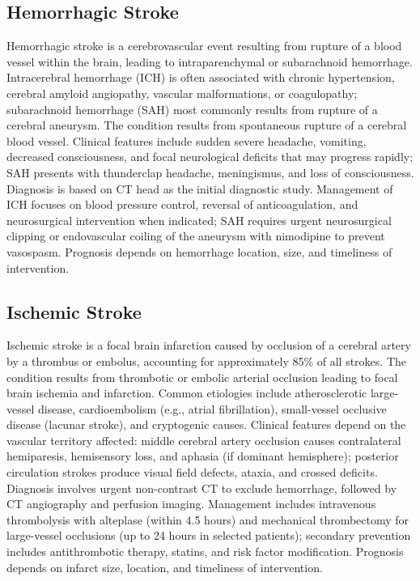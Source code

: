 \subsection{Hemorrhagic Stroke}
\label{sec:Hemorrhagic Stroke}
Hemorrhagic stroke is a cerebrovascular event resulting from rupture of a blood vessel within the brain, leading to intraparenchymal or subarachnoid hemorrhage. Intracerebral hemorrhage (ICH) is often associated with chronic hypertension, cerebral amyloid angiopathy, vascular malformations, or coagulopathy; subarachnoid hemorrhage (SAH) most commonly results from rupture of a cerebral aneurysm. The condition results from spontaneous rupture of a cerebral blood vessel. Clinical features include sudden severe headache, vomiting, decreased consciousness, and focal neurological deficits that may progress rapidly; SAH presents with thunderclap headache, meningismus, and loss of consciousness. Diagnosis is based on CT head as the initial diagnostic study. Management of ICH focuses on blood pressure control, reversal of anticoagulation, and neurosurgical intervention when indicated; SAH requires urgent neurosurgical clipping or endovascular coiling of the aneurysm with nimodipine to prevent vasospasm. Prognosis depends on hemorrhage location, size, and timeliness of intervention.

\subsection{Ischemic Stroke}
\label{sec:Ischemic Stroke}
Ischemic stroke is a focal brain infarction caused by occlusion of a cerebral artery by a thrombus or embolus, accounting for approximately 85\% of all strokes. The condition results from thrombotic or embolic arterial occlusion leading to focal brain ischemia and infarction. Common etiologies include atherosclerotic large-vessel disease, cardioembolism (e.g., atrial fibrillation), small-vessel occlusive disease (lacunar stroke), and cryptogenic causes. Clinical features depend on the vascular territory affected: middle cerebral artery occlusion causes contralateral hemiparesis, hemisensory loss, and aphasia (if dominant hemisphere); posterior circulation strokes produce visual field defects, ataxia, and crossed deficits. Diagnosis involves urgent non-contrast CT to exclude hemorrhage, followed by CT angiography and perfusion imaging. Management includes intravenous thrombolysis with alteplase (within 4.5 hours) and mechanical thrombectomy for large-vessel occlusions (up to 24 hours in selected patients); secondary prevention includes antithrombotic therapy, statins, and risk factor modification. Prognosis depends on infarct size, location, and timeliness of intervention.

